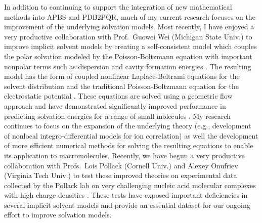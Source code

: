 \documentclass[11pt]{amsart}
\begin{document}
In addition to continuing to support the integration of new mathematical methods into APBS and PDB2PQR, much of my current research focuses on the improvement of the underlying solvation models.  
Most recently, I have enjoyed a very productive collaboration with Prof.\ Guowei Wei (Michigan State Univ.) to improve implicit solvent models by creating a self-consistent model which couples the polar solvation modeled by the Poisson-Boltzmann equation with important nonpolar terms such as dispersion and cavity formation energies \cite{Wagoner2006}.  
The resulting model has the form of coupled nonlinear Laplace-Beltrami equations for the solvent distribution and the traditional Poisson-Boltzmann equation for the electrostatic potential \cite{Chen2010, Chen2011}.
These equations are solved using a geometric flow approach and have demonstrated significantly improved performance in predicting solvation energies for a range of small molecules \cite{Daily2013, Thomas2013}.
My research continues to focus on the expansion of the underlying theory (e.g., development of nonlocal integro-differential models for ion correlation) as well the development of more efficient numerical methods for solving the resulting equations to enable its application to macromolecules.
Recently, we have begun a very productive collaboration with Profs.\ Lois Pollack (Cornell Univ.) and Alexey Onufriev (Virginia Tech Univ.) to test these improved theories on experimental data collected by the Pollack lab on very challenging nucleic acid molecular complexes with high charge densities \cite{Igor}.
These tests have exposed important deficiencies in several implicit solvent models and provide an essential dataset for our ongoing effort to improve solvation models.
\end{document}
